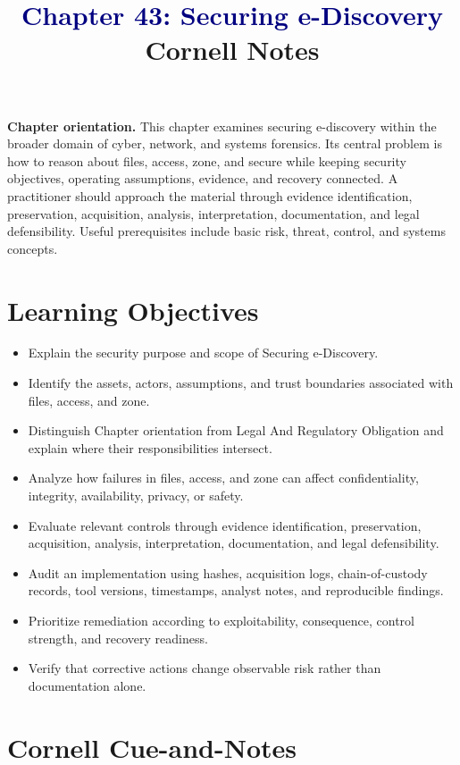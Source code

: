 \documentclass[11pt]{article}
\title{\textcolor{Navy}{Chapter 43: Securing e-Discovery}\\[2mm]\large Cornell Notes}
\author{}
\date{}
\begin{document}
\maketitle
\thispagestyle{fancy}
\vspace{-1.5em}
\begin{orientationbox}
\textbf{Chapter orientation.} This chapter examines securing e-discovery within the broader domain of cyber, network, and systems forensics. Its central problem is how to reason about files, access, zone, and secure while keeping security objectives, operating assumptions, evidence, and recovery connected. A practitioner should approach the material through evidence identification, preservation, acquisition, analysis, interpretation, documentation, and legal defensibility. Useful prerequisites include basic risk, threat, control, and systems concepts.
\end{orientationbox}
\section*{Learning Objectives}
\begin{itemize}
\item Explain the security purpose and scope of Securing e-Discovery.
\item Identify the assets, actors, assumptions, and trust boundaries associated with files, access, and zone.
\item Distinguish Chapter orientation from Legal And Regulatory Obligation and explain where their responsibilities intersect.
\item Analyze how failures in files, access, and zone can affect confidentiality, integrity, availability, privacy, or safety.
\item Evaluate relevant controls through evidence identification, preservation, acquisition, analysis, interpretation, documentation, and legal defensibility.
\item Audit an implementation using hashes, acquisition logs, chain-of-custody records, tool versions, timestamps, analyst notes, and reproducible findings.
\item Prioritize remediation according to exploitability, consequence, control strength, and recovery readiness.
\item Verify that corrective actions change observable risk rather than documentation alone.
\end{itemize}
\section*{Cornell Cue-and-Notes}
\end{document}
